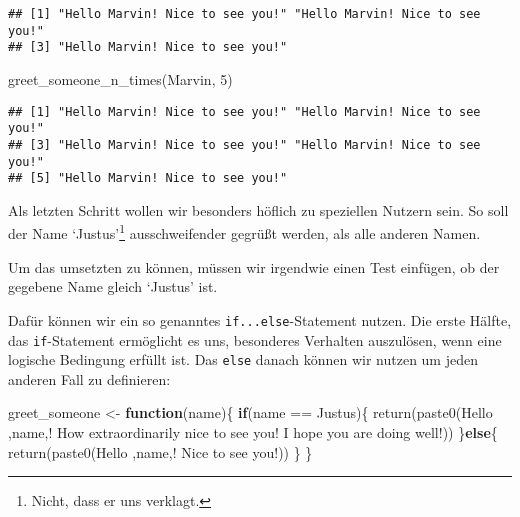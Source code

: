\documentclass[
]{book}
\newenvironment{Shaded}{\begin{snugshade}}{\end{snugshade}}
\newcommand{\ControlFlowTok}[1]{\textcolor[rgb]{0.13,0.29,0.53}{\textbf{#1}}}
\newcommand{\DecValTok}[1]{\textcolor[rgb]{0.00,0.00,0.81}{#1}}
\newcommand{\FunctionTok}[1]{\textcolor[rgb]{0.00,0.00,0.00}{#1}}
\newcommand{\NormalTok}[1]{#1}
\newcommand{\OtherTok}[1]{\textcolor[rgb]{0.56,0.35,0.01}{#1}}
\newcommand{\SpecialCharTok}[1]{\textcolor[rgb]{0.00,0.00,0.00}{#1}}
\newcommand{\StringTok}[1]{\textcolor[rgb]{0.31,0.60,0.02}{#1}}
\begin{document}
\begin{verbatim}
## [1] "Hello Marvin! Nice to see you!" "Hello Marvin! Nice to see you!"
## [3] "Hello Marvin! Nice to see you!"
\end{verbatim}

\begin{Shaded}
\begin{Highlighting}[]
\FunctionTok{greet\_someone\_n\_times}\NormalTok{(}\StringTok{\textquotesingle{}Marvin\textquotesingle{}}\NormalTok{, }\DecValTok{5}\NormalTok{)}
\end{Highlighting}
\end{Shaded}

\begin{verbatim}
## [1] "Hello Marvin! Nice to see you!" "Hello Marvin! Nice to see you!"
## [3] "Hello Marvin! Nice to see you!" "Hello Marvin! Nice to see you!"
## [5] "Hello Marvin! Nice to see you!"
\end{verbatim}

Als letzten Schritt wollen wir besonders höflich zu speziellen Nutzern sein. So soll der Name `Justus'\footnote{Nicht, dass er uns verklagt.} ausschweifender gegrüßt werden, als alle anderen Namen.

Um das umsetzten zu können, müssen wir irgendwie einen Test einfügen, ob der gegebene Name gleich `Justus' ist.

Dafür können wir ein so genanntes \texttt{if...else}-Statement nutzen.
Die erste Hälfte, das \texttt{if}-Statement ermöglicht es uns, besonderes Verhalten auszulösen, wenn eine logische Bedingung erfüllt ist. Das \texttt{else} danach können wir nutzen um jeden anderen Fall zu definieren:

\begin{Shaded}
\begin{Highlighting}[]
\NormalTok{greet\_someone }\OtherTok{\textless{}{-}} \ControlFlowTok{function}\NormalTok{(name)\{}
  \ControlFlowTok{if}\NormalTok{(name }\SpecialCharTok{==} \StringTok{\textquotesingle{}Justus\textquotesingle{}}\NormalTok{)\{}
    \FunctionTok{return}\NormalTok{(}\FunctionTok{paste0}\NormalTok{(}\StringTok{\textquotesingle{}Hello \textquotesingle{}}\NormalTok{,name,}\StringTok{\textquotesingle{}! How extraordinarily nice to see you! I hope you are doing well!\textquotesingle{}}\NormalTok{))}
\NormalTok{  \}}\ControlFlowTok{else}\NormalTok{\{}
    \FunctionTok{return}\NormalTok{(}\FunctionTok{paste0}\NormalTok{(}\StringTok{\textquotesingle{}Hello \textquotesingle{}}\NormalTok{,name,}\StringTok{\textquotesingle{}! Nice to see you!\textquotesingle{}}\NormalTok{))}
\NormalTok{  \}}
\NormalTok{\}}
\end{Highlighting}
\end{Shaded}
\end{document}
